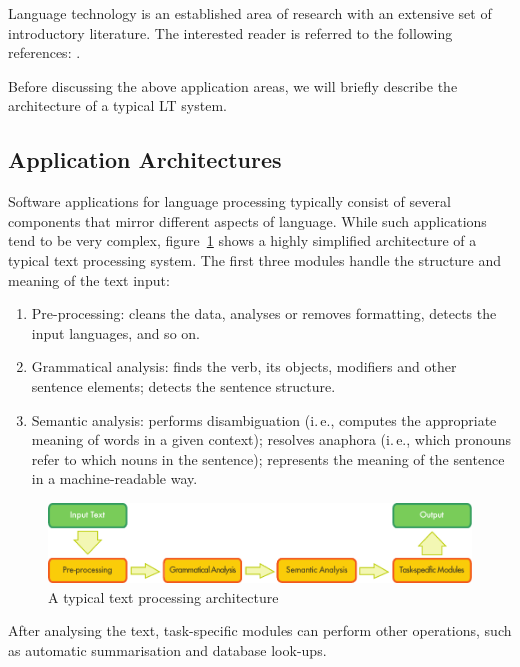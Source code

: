 \begin{multicols}{2}
Language technology is an established area of research with an extensive set of introductory literature. The interested reader is referred to the following references: \cite{boo6, boo7, boo8, str37, boo9}.

Before discussing the above application areas, we will briefly describe the architecture of a typical LT system.

\subsection{Application Architectures}

Software applications for language processing typically consist of several components that mirror different aspects of language. While such applications tend to be very complex, figure~\ref{fig:textprocessingarch_en} shows a highly simplified architecture of a typical text processing system. The first three modules handle the structure and meaning of the text input:

\begin{enumerate}
\item Pre-processing: cleans the data, analyses or removes formatting, detects the input languages, and so on.
\item Grammatical analysis: finds the verb, its objects, modifiers and other sentence elements; detects the sentence structure.
\item Semantic analysis: performs disambiguation (i.\,e., computes the appropriate meaning of words in a given context); resolves anaphora (i.\,e., which pronouns refer to which nouns in the sentence); represents the meaning of the sentence in a machine-readable way.
\end{enumerate}

\begin{figure}[b]
  \center
  \includegraphics[width=\textwidth]{../_media/english/text_processing_app_architecture}
  \caption{A typical text processing architecture}
  \label{fig:textprocessingarch_en}
\end{figure}

After analysing the text, task-specific modules can perform other operations, such as automatic summarisation and database look-ups.


\end{multicols}
